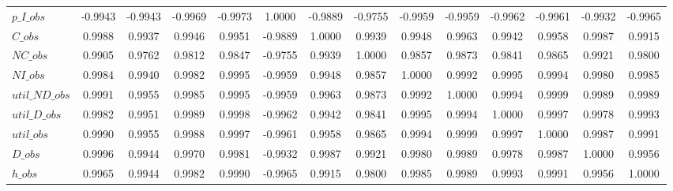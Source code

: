 \begin{center}
\begin{longtable}{lccccccccccccc}
$p\_I\_obs      $	 & 	          -0.9943	 & 	          -0.9943	 & 	          -0.9969	 & 	          -0.9973	 & 	           1.0000	 & 	          -0.9889	 & 	          -0.9755	 & 	          -0.9959	 & 	          -0.9959	 & 	          -0.9962	 & 	          -0.9961	 & 	          -0.9932	 & 	          -0.9965 \\ 
$C\_obs         $	 & 	           0.9988	 & 	           0.9937	 & 	           0.9946	 & 	           0.9951	 & 	          -0.9889	 & 	           1.0000	 & 	           0.9939	 & 	           0.9948	 & 	           0.9963	 & 	           0.9942	 & 	           0.9958	 & 	           0.9987	 & 	           0.9915 \\ 
$NC\_obs        $	 & 	           0.9905	 & 	           0.9762	 & 	           0.9812	 & 	           0.9847	 & 	          -0.9755	 & 	           0.9939	 & 	           1.0000	 & 	           0.9857	 & 	           0.9873	 & 	           0.9841	 & 	           0.9865	 & 	           0.9921	 & 	           0.9800 \\ 
$NI\_obs        $	 & 	           0.9984	 & 	           0.9940	 & 	           0.9982	 & 	           0.9995	 & 	          -0.9959	 & 	           0.9948	 & 	           0.9857	 & 	           1.0000	 & 	           0.9992	 & 	           0.9995	 & 	           0.9994	 & 	           0.9980	 & 	           0.9985 \\ 
$util\_ND\_obs  $	 & 	           0.9991	 & 	           0.9955	 & 	           0.9985	 & 	           0.9995	 & 	          -0.9959	 & 	           0.9963	 & 	           0.9873	 & 	           0.9992	 & 	           1.0000	 & 	           0.9994	 & 	           0.9999	 & 	           0.9989	 & 	           0.9989 \\ 
$util\_D\_obs   $	 & 	           0.9982	 & 	           0.9951	 & 	           0.9989	 & 	           0.9998	 & 	          -0.9962	 & 	           0.9942	 & 	           0.9841	 & 	           0.9995	 & 	           0.9994	 & 	           1.0000	 & 	           0.9997	 & 	           0.9978	 & 	           0.9993 \\ 
$util\_obs      $	 & 	           0.9990	 & 	           0.9955	 & 	           0.9988	 & 	           0.9997	 & 	          -0.9961	 & 	           0.9958	 & 	           0.9865	 & 	           0.9994	 & 	           0.9999	 & 	           0.9997	 & 	           1.0000	 & 	           0.9987	 & 	           0.9991 \\ 
$D\_obs         $	 & 	           0.9996	 & 	           0.9944	 & 	           0.9970	 & 	           0.9981	 & 	          -0.9932	 & 	           0.9987	 & 	           0.9921	 & 	           0.9980	 & 	           0.9989	 & 	           0.9978	 & 	           0.9987	 & 	           1.0000	 & 	           0.9956 \\ 
$h\_obs         $	 & 	           0.9965	 & 	           0.9944	 & 	           0.9982	 & 	           0.9990	 & 	          -0.9965	 & 	           0.9915	 & 	           0.9800	 & 	           0.9985	 & 	           0.9989	 & 	           0.9993	 & 	           0.9991	 & 	           0.9956	 & 	           1.0000 \\ 
\end{longtable}
 \end{center}
